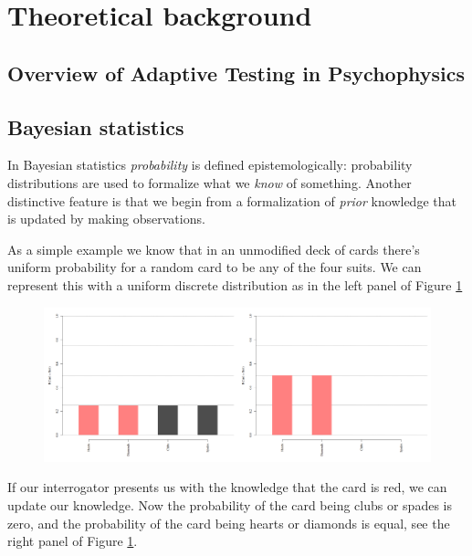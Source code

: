 \section{Theoretical background}

\subsection{Overview of Adaptive Testing in Psychophysics}

\subsection{Bayesian statistics}

In Bayesian statistics \textit{probability} is defined epistemologically: probability distributions are used to formalize what we \textit{know} of something. Another distinctive feature is that we begin from a formalization of \textit{prior} knowledge that is updated by making observations. 

As a simple example we know that in an unmodified deck of cards there's uniform probability for a random card to be any of the four suits. We can represent this with a uniform discrete distribution as in the left panel of Figure \ref{fig:suitsDiscUnif}

\begin{figure}[htb]
	\begin{center}
		\includegraphics[width=5in]{Parts/TheoreticalBackground/Figs/discrBayes.png}
	\end{center}
	\caption{}
	\label{fig:suitsDiscUnif}
\end{figure}	

If our interrogator presents us with the knowledge that the card is red, we can update our knowledge. Now the probability of the card being clubs or spades is zero, and the probability of the card being hearts or diamonds is equal, see the right panel of Figure \ref{fig:suitsDiscUnif}. 



